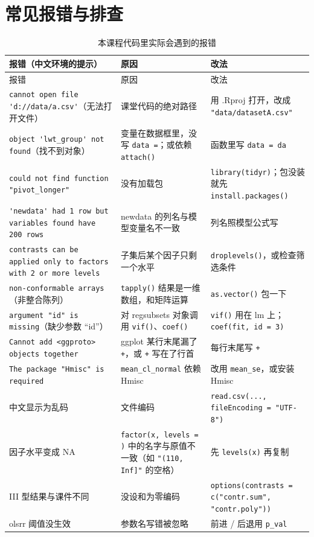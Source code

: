 \section{常见报错与排查}
\label{app:errors}
\begingroup\small
\begin{longtable}{@{}p{5.2cm}p{4.2cm}p{4.8cm}@{}}
\caption{本课程代码里实际会遇到的报错}\\
\toprule
报错（中文环境的提示） & 原因 & 改法\\
\midrule
\endfirsthead
\toprule
报错 & 原因 & 改法\\
\midrule
\endhead
\bottomrule
\endfoot
\Verb|cannot open file 'd://data/a.csv'|（无法打开文件） & 课堂代码的绝对路径 & 用 .Rproj 打开，改成 \Verb|"data/datasetA.csv"|\\
\Verb|object 'lwt_group' not found|（找不到对象） & 变量在数据框里，没写 \Verb|data =|；或依赖 \Verb|attach()| & 函数里写 \Verb|data = da|\\
\Verb|could not find function "pivot_longer"| & 没有加载包 & \Verb|library(tidyr)|；包没装就先 \Verb|install.packages()|\\
\Verb|'newdata' had 1 row but variables found have 200 rows| & newdata 的列名与模型变量名不一致 & 列名照模型公式写\\
\Verb|contrasts can be applied only to factors with 2 or more levels| & 子集后某个因子只剩一个水平 & \Verb|droplevels()|，或检查筛选条件\\
\Verb|non-conformable arrays|（非整合陈列） & \Verb|tapply()| 结果是一维数组，和矩阵运算 & \Verb|as.vector()| 包一下\\
\Verb|argument "id" is missing|（缺少参数 “id”） & 对 regsubsets 对象调用 \Verb|vif()|、\Verb|coef()| & \Verb|vif()| 用在 lm 上；\Verb|coef(fit, id = 3)|\\
\Verb|Cannot add <ggproto> objects together| & ggplot 某行末尾漏了 \Verb|+|，或 \Verb|+| 写在了行首 & 每行末尾写 \Verb|+|\\
\Verb|The package "Hmisc" is required| & \Verb|mean_cl_normal| 依赖 Hmisc & 改用 \Verb|mean_se|，或安装 Hmisc\\
中文显示为乱码 & 文件编码 & \Verb|read.csv(..., fileEncoding = "UTF-8")|\\
因子水平变成 NA & \Verb|factor(x, levels = )| 中的名字与原值不一致（如 \Verb|"(110, Inf]"| 的空格） & 先 \Verb|levels(x)| 再复制\\
III 型结果与课件不同 & 没设和为零编码 & \Verb|options(contrasts = c("contr.sum", "contr.poly"))|\\
olsrr 阈值没生效 & 参数名写错被忽略 & 前进 / 后退用 \Verb|p_val|\\
\end{longtable}
\endgroup

